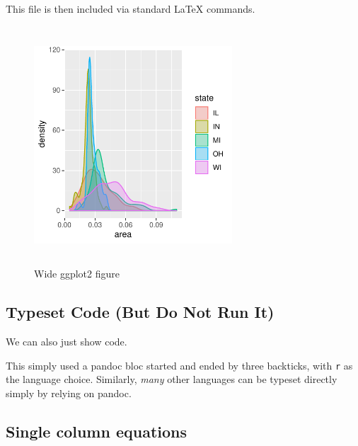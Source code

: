 \documentclass[letterpaper,9pt,twocolumn,twoside,]{pinp}
\begin{document}
This file is then included via standard LaTeX commands.

\begin{figure}
  \begin{center}
    \includegraphics[width=0.66\textwidth, height=3.5in]{densities} 
  \end{center}
  \caption{Wide ggplot2 figure}\label{fig}
\end{figure}

\hypertarget{typeset-code-but-do-not-run-it}{%
\subsection{Typeset Code (But Do Not Run
It)}\label{typeset-code-but-do-not-run-it}}

We can also just show code.

\begin{Shaded}
\begin{Highlighting}[]
\StringTok{ }\NormalTok{faithful[,}\NormalTok{]}
\StringTok{ }
\end{Highlighting}
\end{Shaded}

This simply used a pandoc bloc started and ended by three backticks,
with \texttt{r} as the language choice. Similarly, \emph{many} other
languages can be typeset directly simply by relying on pandoc.

\hypertarget{single-column-equations}{%
\subsection{Single column equations}\label{single-column-equations}}
\end{document}
